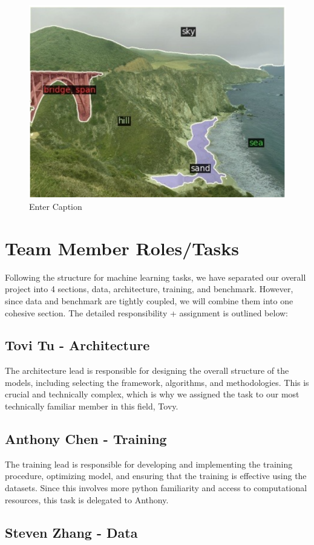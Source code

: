 \documentclass[10pt,twocolumn,letterpaper]{article}
\begin{document}
\begin{figure} [h]
    \centering
    \includegraphics[width=0.5\linewidth]{images/seg_sample.png}
    \caption{Enter Caption}
    \label{fig:enter-label}
\end{figure}
 

\section{Team Member Roles/Tasks}
\label{sec:roles}
Following the structure for machine learning tasks, we have separated our overall project into 4 sections, data, architecture, training, and benchmark. However, since data and benchmark are tightly coupled, we will combine them into one cohesive section. The detailed responsibility + assignment is outlined below:

\subsection{Tovi Tu - Architecture}

 The architecture lead is responsible for designing the overall structure of the models, including selecting the framework, algorithms, and methodologies. This is crucial and technically complex, which is why we assigned the task to our most technically familiar member in this field, Tovy.


\subsection{Anthony Chen - Training}
The training lead is responsible for developing and implementing the training procedure, optimizing model, and ensuring that the training is effective using the datasets. Since this involves more python familiarity and access to computational resources, this task is delegated to Anthony.


\subsection{Steven Zhang - Data}
\end{document}
